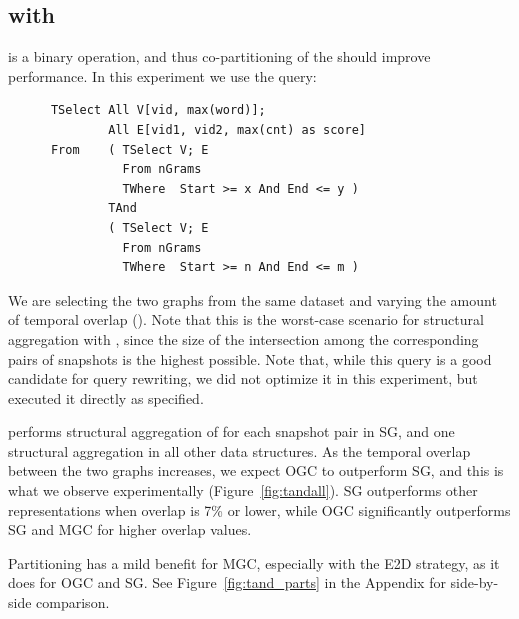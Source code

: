\subsection{ with }

 is a binary operation, and thus co-partitioning of the
\tgs should improve performance.  In this experiment we use the query:

\begin{small}
\begin{verbatim}
      TSelect All V[vid, max(word)];
              All E[vid1, vid2, max(cnt) as score]
      From    ( TSelect V; E
                From nGrams
                TWhere  Start >= x And End <= y )
              TAnd
              ( TSelect V; E
                From nGrams
                TWhere  Start >= n And End <= m )      
\end{verbatim}
\end{small}

We are selecting the two graphs from the same dataset and varying the
amount of temporal overlap ().  Note that this is the
worst-case scenario for structural aggregation with , since
the size of the intersection among the corresponding pairs of
snapshots is the highest possible.  Note that, while this query is a
good candidate for query rewriting, we did not optimize it in this
experiment, but executed it directly as specified.

 performs structural aggregation of for each snapshot pair
in SG, and one structural aggregation in all other data structures.
As the temporal overlap between the two graphs increases, we expect
OGC to outperform SG, and this is what we observe experimentally
(Figure~\ref{fig:tandall}).  SG outperforms other representations when
overlap is 7\% or lower, while OGC significantly outperforms SG and
MGC for higher overlap values.

Partitioning has a mild benefit for MGC, especially with the E2D
strategy, as it does for OGC and SG. See Figure~\ref{fig:tand_parts}
in the Appendix for side-by-side comparison.


